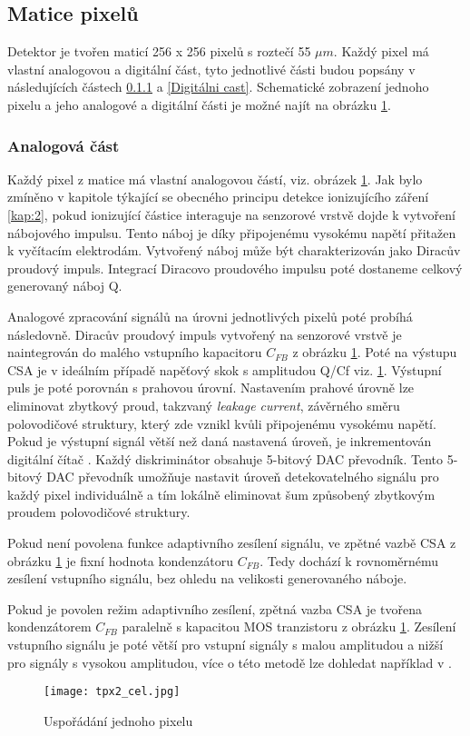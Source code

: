 \subsection{Matice pixelů}
Detektor je tvořen maticí 256 x 256 pixelů s roztečí  55 $\mu$$m$. Každý pixel má vlastní analogovou a digitální část, tyto jednotlivé části budou popsány v následujících částech \ref{analog} a \ref{Digitálni cast}. Schematické zobrazení jednoho pixelu a jeho analogové a digitální části je možné najít na obrázku \ref{fig:tpx2_cell}.
\subsubsection{Analogová část}	 %
\label{analog}
Každý pixel z matice má vlastní analogovou částí, viz. obrázek \ref{fig:tpx2_cell}. Jak bylo zmíněno v kapitole týkající se obecného principu detekce ionizujícího záření \ref{kap:2}, pokud ionizující částice interaguje na senzorové vrstvě dojde k vytvoření nábojového impulsu. Tento náboj je díky připojenému vysokému napětí přitažen k vyčítacím elektrodám. Vytvořený náboj může být charakterizován jako Diracův proudový impuls. Integrací Diracovo proudového impulsu poté dostaneme celkový generovaný náboj Q. 
\par Analogové zpracování signálů na úrovni jednotlivých pixelů poté probíhá následovně. Diracův proudový impuls vytvořený na senzorové vrstvě je naintegrován do malého vstupního kapacitoru $C_{FB}$ z obrázku \ref{fig:tpx2_cell}. Poté na výstupu CSA je v ideálním případě napěťový skok s amplitudou Q/Cf viz. \ref{fig:tpx2_cell}. Výstupní puls je poté porovnán s prahovou úrovní. Nastavením prahové úrovně lze eliminovat zbytkový proud, takzvaný \textit{leakage current}, závěrného směru polovodičové struktury, který zde vznikl kvůli připojenému vysokému napětí. Pokud je výstupní signál větší než daná nastavená úroveň, je inkrementován digitální čítač \cite{Llopart}. Každý diskriminátor obsahuje 5-bitový DAC převodník. Tento 5-bitový DAC převodník umožňuje nastavit úroveň detekovatelného signálu pro každý pixel individuálně a tím lokálně eliminovat šum způsobený zbytkovým proudem polovodičové struktury.
\par Pokud není povolena funkce adaptivního zesílení signálu, ve zpětné vazbě CSA z obrázku \ref{fig:tpx2_cell} je fixní hodnota kondenzátoru $C_{FB}$. Tedy dochází k rovnoměrnému zesílení vstupního signálu, bez ohledu na velikosti generovaného náboje. 
\par Pokud je povolen režim adaptivního zesílení, zpětná vazba CSA je tvořena kondenzátorem $C_{FB}$ paralelně s kapacitou MOS tranzistoru z obrázku \ref{fig:tpx2_cell}. Zesílení vstupního signálu je poté větší pro vstupní signály s malou amplitudou a nižší pro signály s vysokou amplitudou, více o této metodě lze dohledat například v \cite{MOS}.
\begin{figure}[h!]
	\centering
	\captionsetup{justification=centering}
	\texttt{[image: tpx2\_cel.jpg]}
	\caption{Uspořádání jednoho pixelu \cite{Timepix2}}
	\label{fig:tpx2_cell}
\end{figure}

